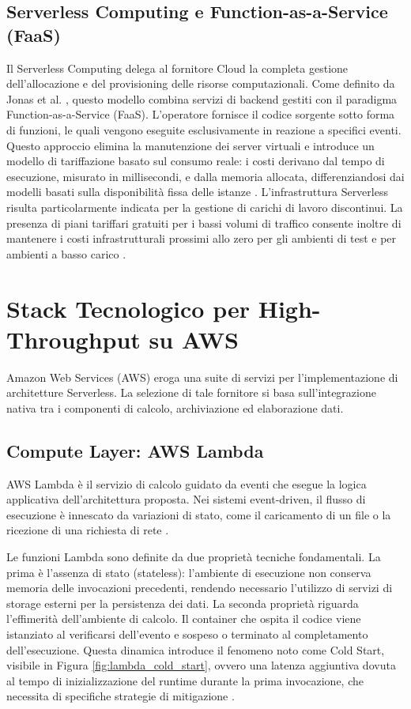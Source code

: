 \subsection{Serverless Computing e Function-as-a-Service (FaaS)}
Il Serverless Computing delega al fornitore Cloud la completa gestione dell'allocazione e del provisioning delle risorse computazionali. Come definito da Jonas et al. \cite{BerkeleyServerless}, questo modello combina servizi di backend gestiti con il paradigma Function-as-a-Service (FaaS).
L'operatore fornisce il codice sorgente sotto forma di funzioni, le quali vengono eseguite esclusivamente in reazione a specifici eventi. Questo approccio elimina la manutenzione dei server virtuali e introduce un modello di tariffazione basato sul consumo reale: i costi derivano dal tempo di esecuzione, misurato in millisecondi, e dalla memoria allocata, differenziandosi dai modelli basati sulla disponibilità fissa delle istanze \cite{EC2}.
L'infrastruttura Serverless risulta particolarmente indicata per la gestione di carichi di lavoro discontinui. La presenza di piani tariffari gratuiti per i bassi volumi di traffico consente inoltre di mantenere i costi infrastrutturali prossimi allo zero per gli ambienti di test e per ambienti a basso carico \cite{EivyEconomics}.

\section{Stack Tecnologico per High-Throughput su AWS}
\label{sec:aws_stack}

Amazon Web Services (AWS) eroga una suite di servizi per l'implementazione di architetture Serverless. La selezione di tale fornitore si basa sull'integrazione nativa tra i componenti di calcolo, archiviazione ed elaborazione dati.

\subsection{Compute Layer: AWS Lambda}
AWS Lambda è il servizio di calcolo guidato da eventi che esegue la logica applicativa dell'architettura proposta. Nei sistemi event-driven, il flusso di esecuzione è innescato da variazioni di stato, come il caricamento di un file o la ricezione di una richiesta di rete \cite{EventDrivenArchitecture}.

Le funzioni Lambda sono definite da due proprietà tecniche fondamentali. La prima è l'assenza di stato (stateless): l'ambiente di esecuzione non conserva memoria delle invocazioni precedenti, rendendo necessario l'utilizzo di servizi di storage esterni per la persistenza dei dati.
La seconda proprietà riguarda l'effimerità dell'ambiente di calcolo. Il container che ospita il codice viene istanziato al verificarsi dell'evento e sospeso o terminato al completamento dell'esecuzione. Questa dinamica introduce il fenomeno noto come Cold Start, visibile in Figura \ref{fig:lambda_cold_start}, ovvero una latenza aggiuntiva dovuta al tempo di inizializzazione del runtime durante la prima invocazione, che necessita di specifiche strategie di mitigazione \cite{WangColdStart}.

